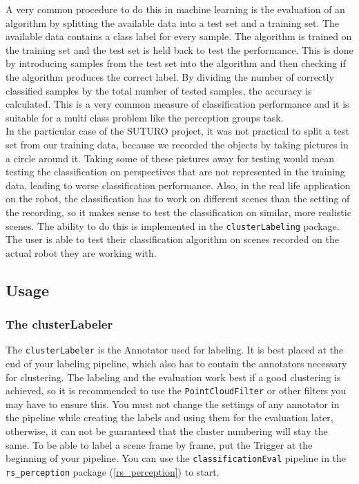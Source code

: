 \documentclass[main.tex]{subfiles}
\begin{document}
A very common procedure to do this in machine learning is the evaluation of an algorithm by splitting the available data into a test set and a training set. The available data contains a class label for every sample. The algorithm is trained on the training set and the test set is held back to test the performance. This is done by introducing samples from the test set into the algorithm and then checking if the algorithm produces the correct label. By dividing the number of correctly classified samples by the total number of tested samples, the accuracy is calculated. This is a very common measure of classification performance and it is suitable for a multi class problem like the perception groups task.\\

In the particular case of the SUTURO project, it was not practical to split a test set from our training data, because we recorded the objects by taking pictures in a circle around it. Taking some of these pictures away for testing would mean testing the classification on perspectives that are not represented in the training data, leading to worse classification performance. Also, in the real life application on the robot, the classification has to work on different scenes than the setting of the recording, so it makes sense to test the classification on similar, more realistic scenes. The ability to do this is implemented in the \texttt{clusterLabeling} package. The user is able to test their classification algorithm on scenes recorded on the actual robot they are working with.  

\subsection{Usage}\label{clusterLabeling Usage}

\subsubsection{The clusterLabeler}
The \texttt{clusterLabeler} is the Annotator used for labeling. It is best placed at the end of your labeling pipeline, which also has to contain the annotators necessary for clustering. The labeling and the evaluation work best if a good clustering is achieved, so it is recommended to use the \texttt{PointCloudFilter} or other filters you may have to ensure this. You must not change the settings of any annotator in the pipeline while creating the labels and using them for the evaluation later, otherwise, it can not be guaranteed that the cluster numbering will stay the same. To be able to label a scene frame by frame, put the Trigger at the beginning of your pipeline. You can use the \texttt{classificationEval} pipeline in the \texttt{rs\_perception} package (\ref{rs_perception}) to start.\\
\end{document}
